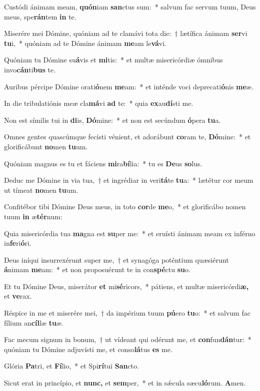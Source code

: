 \item Custódi ánimam meam, \textbf{quón}iam \textbf{san}ctus sum:~* salvum fac servum tuum, Deus meus, spe\textbf{rán}tem \textbf{in} te.
\item Miserére mei Dómine, quóniam ad te clamávi tota die:~† lætífica ánimam \textbf{ser}vi \textbf{tu}i,~* quóniam ad te Dómine ánimam \textbf{me}am le\textbf{vá}vi.
\item Quóniam tu Dómine su\textbf{á}vis et \textbf{mi}tis:~* et multæ misericórdiæ ómnibus invo\textbf{cán}ti\textbf{bus} te.
\item Auribus pércipe Dómine orati\textbf{ó}nem \textbf{me}am:~* et inténde voci deprecati\textbf{ó}nis \textbf{me}æ.
\item In die tribulatiónis meæ cla\textbf{má}vi \textbf{ad} te:~* quia \textbf{ex}au\textbf{dí}sti me.
\item Non est símilis tui in \textbf{di}is, \textbf{Dó}mine:~* et non est secúndum \textbf{ó}pera \textbf{tu}a.
\item Omnes gentes quascúmque fecísti vénient, et adorábunt \textbf{co}ram te, \textbf{Dó}mine:~* et glorificábunt \textbf{no}men \textbf{tu}um.
\item Quóniam magnus es tu et fáciens \textbf{mi}ra\textbf{bí}lia:~* tu es \textbf{De}us \textbf{so}lus.
\item Deduc me Dómine in via tua,~† et ingrédiar in veri\textbf{tá}te \textbf{tu}a:~* lætétur cor meum ut tímeat \textbf{no}men \textbf{tu}um.
\item Confitébor tibi Dómine Deus meus, in toto \textbf{cor}de \textbf{me}o,~* et glorificábo nomen tuum \textbf{in} æ\textbf{tér}num:
\item Quia misericórdia tua \textbf{ma}gna est \textbf{su}per me:~* et eruísti ánimam meam ex inférno in\textbf{fe}ri\textbf{ó}ri.
\item Deus iníqui insurrexérunt super me,~† et synagóga poténtium quæsiérunt \textbf{á}nimam \textbf{me}am:~* et non proposuérunt te in con\textbf{spé}ctu \textbf{su}o.
\item Et tu Dómine Deus, miserátor \textbf{et} mi\textbf{sé}ricors,~* pátiens, et multæ misericórdi\textbf{æ,} et \textbf{ve}rax.
\item Réspice in me et miserére mei,~† da impérium tuum \textbf{pú}ero \textbf{tu}o:~* et salvum fac fílium an\textbf{cíl}læ \textbf{tu}æ.
\item Fac mecum signum in bonum,~† ut vídeant qui odérunt me, et \textbf{con}fun\textbf{dán}tur:~* quóniam tu Dómine adjuvísti me, et conso\textbf{lá}tus \textbf{es} me.
\item Glória \textbf{Pa}tri, et \textbf{Fí}lio,~* et Spi\textbf{rí}tui \textbf{San}cto.
\item Sicut erat in princípio, et \textbf{nunc,} et \textbf{sem}per,~* et in sǽcula sæcu\textbf{ló}rum. \textbf{A}men.
